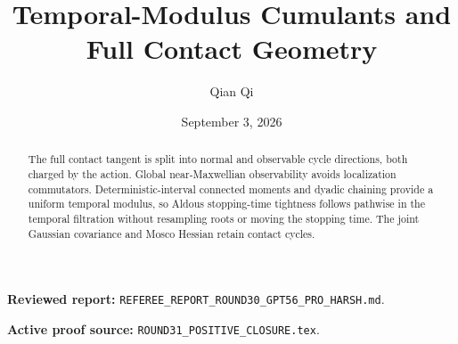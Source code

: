 \documentclass[11pt,reqno]{amsart}
\title[B3 Round 31 revision]{Temporal-Modulus Cumulants and Full Contact Geometry}
\author{Qian Qi}
\date{September 3, 2026}
\begin{document}
\begin{abstract}
The full contact tangent is split into normal and observable cycle directions, both charged by the action.  Global near-Maxwellian observability avoids localization commutators.  Deterministic-interval connected moments and dyadic chaining provide a uniform temporal modulus, so Aldous stopping-time tightness follows pathwise in the temporal filtration without resampling roots or moving the stopping time.  The joint Gaussian covariance and Mosco Hessian retain contact cycles.
\end{abstract}
\maketitle
\noindent\textbf{Reviewed report:} \texttt{REFEREE\_REPORT\_ROUND30\_GPT56\_PRO\_HARSH.md}.\par
\noindent\textbf{Active proof source:} \texttt{ROUND31\_POSITIVE\_CLOSURE.tex}.\par

\end{document}
